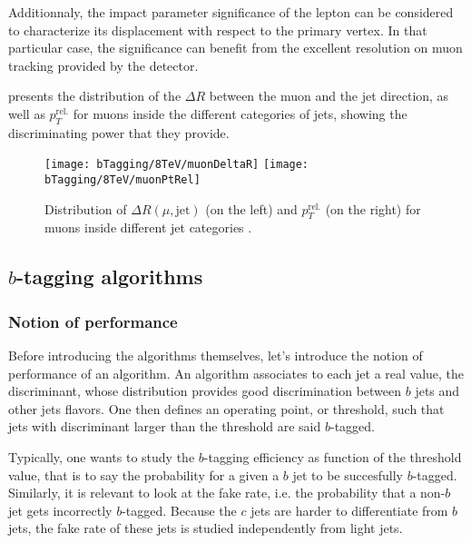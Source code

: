     Additionnaly, the impact parameter significance of the lepton can be considered to
    characterize its displacement with respect to the primary vertex. In that particular
    case, the significance can benefit from the excellent resolution on muon tracking
    provided by the detector.

     presents the distribution of
    the $\Delta R$ between the muon and the jet direction, as well as $p_T^\text{rel.}$ for
    muons inside the different categories of jets, showing the discriminating power that
    they provide.

    \begin{figure}[th!]
        \centering
        \begin{minipage}{\textwidth}
        \texttt{[image: bTagging/8TeV/muonDeltaR]}
        \texttt{[image: bTagging/8TeV/muonPtRel]}
        \end{minipage}
        \caption{Distribution of $\Delta R(\mu,\text{jet})$ (on the left) and $p_T^\text{rel.}$ (on the right)
        for muons inside different jet categories \cite{SoftLeptonAN}.}
        \label{fig:bTagging/softLepton}
    \end{figure}

    \subsection{$b$-tagging algorithms}

        \subsubsection{Notion of performance}

    Before introducing the algorithms themselves, let's introduce the notion of performance
    of an algorithm. An algorithm associates to each jet a real value, the discriminant,
    whose distribution provides good discrimination between $b$ jets and other jets flavors.
    One then defines an operating point, or threshold, such that jets with discriminant
    larger than the threshold are said $b$-tagged.

    Typically, one wants to study the $b$-tagging efficiency as function of
    the threshold value, that is to say the probability for a given a $b$ jet to be
    succesfully $b$-tagged. Similarly, it is relevant to look at the fake rate, i.e. the
    probability that a non-$b$ jet gets incorrectly $b$-tagged. Because the $c$
    jets are harder to differentiate from $b$ jets, the fake rate of these jets is studied
    independently from light jets.

